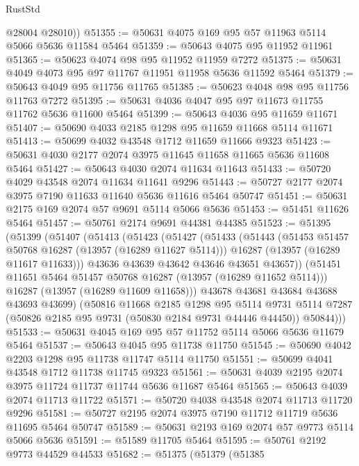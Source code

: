 \begin{lexlean}{RustStd}
\begin{coremodule}
        @28004
        @28010))
@51355 := @50631 @4075 @169 @95 @57 @11963 @5114 @5066 @5636 @11584 @5464
@51359 := @50643 @4075 @95 @11952 @11961
@51365 := @50623 @4074 @98 @95 @11952 @11959 @7272
@51375 := @50631 @4049 @4073 @95 @97 @11767 @11951 @11958 @5636 @11592 @5464
@51379 := @50643 @4049 @95 @11756 @11765
@51385 := @50623 @4048 @98 @95 @11756 @11763 @7272
@51395 := @50631 @4036 @4047 @95 @97 @11673 @11755 @11762 @5636 @11600 @5464
@51399 := @50643 @4036 @95 @11659 @11671
@51407 := @50690 @4033 @2185 @1298 @95 @11659 @11668 @5114 @11671
@51413 := @50699 @4032 @43548 @1712 @11659 @11666 @9323
@51423 := @50631 @4030 @2177 @2074 @3975 @11645 @11658 @11665 @5636 @11608 @5464
@51427 := @50643 @4030 @2074 @11634 @11643
@51433 := @50720 @4029 @43548 @2074 @11634 @11641 @9296
@51443 := @50727 @2177 @2074 @3975 @7190 @11633 @11640 @5636 @11616 @5464 @50747
@51451 := @50631 @2175 @169 @2074 @57 @9691 @5114 @5066 @5636
@51453 := @51451 @11626 @5464
@51457 := @50761 @2174 @9691 @44381 @44385
@51523 := @51395
    (@51399
      (@51407
        (@51413
          (@51423
            (@51427
              (@51433
                (@51443
                  (@51453 @51457 @50768 @16287 (@13957 (@16289 @11627 @5114)))
                  @16287
                  (@13957 (@16289 @11617 @11633)))
                @43636
                @43639
                @43642
                @43646
                @43651
                @43657))
            (@51451 @11651 @5464 @51457 @50768 @16287 (@13957 (@16289 @11652 @5114)))
            @16287
            (@13957 (@16289 @11609 @11658)))
          @43678
          @43681
          @43684
          @43688
          @43693
          @43699)
        (@50816
          @11668
          @2185
          @1298
          @95
          @5114
          @9731
          @5114
          @7287
          (@50826 @2185 @95 @9731 (@50830 @2184 @9731 @44446 @44450))
          @50844)))
@51533 := @50631 @4045 @169 @95 @57 @11752 @5114 @5066 @5636 @11679 @5464
@51537 := @50643 @4045 @95 @11738 @11750
@51545 := @50690 @4042 @2203 @1298 @95 @11738 @11747 @5114 @11750
@51551 := @50699 @4041 @43548 @1712 @11738 @11745 @9323
@51561 := @50631 @4039 @2195 @2074 @3975 @11724 @11737 @11744 @5636 @11687 @5464
@51565 := @50643 @4039 @2074 @11713 @11722
@51571 := @50720 @4038 @43548 @2074 @11713 @11720 @9296
@51581 := @50727 @2195 @2074 @3975 @7190 @11712 @11719 @5636 @11695 @5464 @50747
@51589 := @50631 @2193 @169 @2074 @57 @9773 @5114 @5066 @5636
@51591 := @51589 @11705 @5464
@51595 := @50761 @2192 @9773 @44529 @44533
@51682 := @51375
    (@51379
      (@51385

\end{coremodule}
\end{lexlean}
